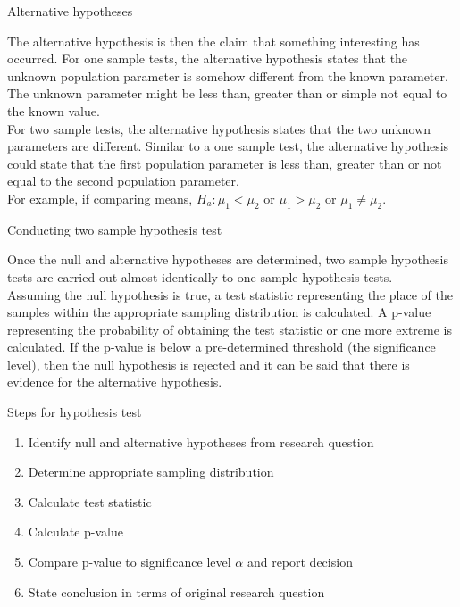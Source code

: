 \documentclass[xcolor=table]{beamer}
\begin{document}
\begin{frame}{Alternative hypotheses}
\begin{block}{}
\large
The alternative hypothesis is then the claim that something interesting has occurred. For one sample tests, the alternative hypothesis states that the unknown population parameter is somehow different from the known parameter. The unknown parameter might be less than, greater than or simple not equal to the known value. \\
\pause\medskip
For two sample tests, the alternative hypothesis states that the two unknown parameters are different. Similar to a one sample test, the alternative hypothesis could state that the first population parameter is less than, greater than or not equal to the second population parameter.\\
\pause\medskip
For example, if comparing means, $H_a: \mu_1 < \mu_2$ or $\mu_1 > \mu_2$ or $\mu_1 \ne \mu_2$.
\end{block}
\end{frame}

\begin{frame}{Conducting two sample hypothesis test}
\begin{block}{}
\large
Once the null and alternative hypotheses are determined, two sample hypothesis tests are carried out almost identically to one sample hypothesis tests.\\
\medskip
Assuming the null hypothesis is true, a test statistic representing the place of the samples within the appropriate sampling distribution is calculated. A p-value representing the probability of obtaining the test statistic or one more extreme is calculated. If the p-value is below a pre-determined threshold (the significance level), then the null hypothesis is rejected and it can be said that there is evidence for the alternative hypothesis.
\end{block}
\end{frame}

\begin{frame}{Steps for hypothesis test}
\begin{block}{}
\large
\begin{enumerate}
\item Identify null and alternative hypotheses from research question
\item Determine appropriate sampling distribution
\item Calculate test statistic
\item Calculate p-value
\item Compare p-value to significance level $\alpha$ and report decision
\item State conclusion in terms of original research question
\end{enumerate}
\end{block}
\end{frame}
\end{document}
